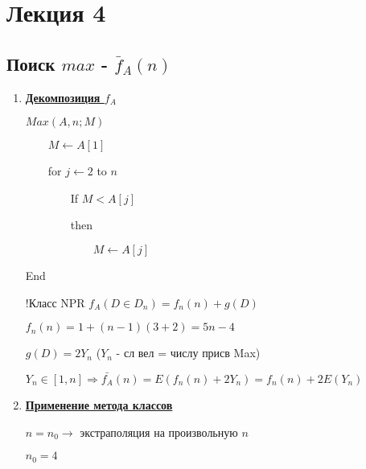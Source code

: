 \documentclass[12pt]{report}
\begin{document}
	\chapter*{Лекция 4}
	\section*{Поиск $max$ - $\bar{f}_A(n)$}
	\begin{enumerate}
		\item \textbf{\underline{Декомпозиция $f_A$}}\par
		$Max(A,n;M)$\par
		$\qquad M \leftarrow A[1]$\par
		$\qquad $for $ j \leftarrow 2 $ to $ n$\par
		$\qquad\qquad $If $ M<A[j]$\par
		$\qquad\qquad $then\par
		$\qquad\qquad\qquad M\leftarrow A[j]$\par
		End\par

		!Класс NPR
		$f_A(D\in D_n)=f_n(n)+g(D)$\par
		$f_n(n)=1+(n-1)(3+2)=5n-4$\par
		$g(D)=2Y_n$ ($Y_n$ - сл вел = числу присв Max)\par
		$Y_n \in [1,n] \Rightarrow \bar{f_A}(n)=E(f_n(n)+2Y_n)=f_n(n)+2E(Y_n)$

		\item \textbf{\underline{Применение метода классов}}\par
		$n=n_0\rightarrow $ экстраполяция на произвольную $n$\par
		$n_0 = 4$\par


\end{enumerate}
\end{document}
